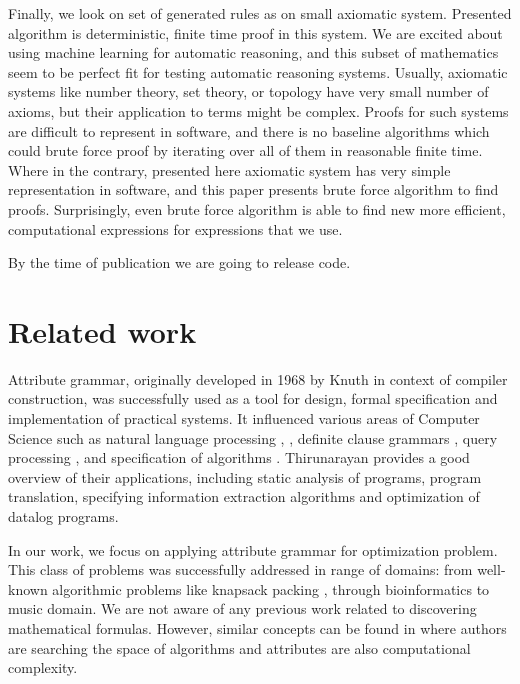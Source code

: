 \documentclass{article}
\begin{document}
Finally, we look on set of generated rules as on small axiomatic system.
Presented algorithm is deterministic, finite time proof in this system.
We are excited about using machine learning for automatic reasoning, and
this subset of mathematics seem to be perfect fit for testing automatic reasoning systems.
Usually, axiomatic systems like number theory, set theory, or topology have very small
number of axioms, but their application to terms might be complex. Proofs
for such systems are difficult to represent in software, and there is no
baseline algorithms which could brute force proof by iterating over all of them in reasonable finite time.
Where in the contrary, presented here axiomatic system has very simple representation
in software, and this paper presents brute force algorithm to find proofs. 
Surprisingly, even brute force algorithm is able to find new more efficient,
computational expressions for expressions that we use.

By the time of publication we are going to release code.


\section{Related work} \label{relatedwork}


Attribute grammar, originally developed in 1968 by Knuth \cite{knuth1968semantics} in context of compiler
construction, was successfully used as a tool for design, formal specification
and implementation of practical systems. It influenced various areas of
Computer Science such as natural language processing \cite{hafiz2011modular}, \cite{starkie2002inferring}, 
definite clause grammars \cite{bratko2001prolog}, query processing \cite{koch2007attribute}, \cite{ramakrishnan1991top} and specification of algorithms \cite{bellanova1984examples}.
Thirunarayan \cite{thirunarayan2009attribute} provides a good overview of their
applications, including static analysis of programs, program translation, specifying information
extraction algorithms and optimization of datalog programs.

In our work, we focus on applying attribute grammar for optimization problem. This class
of problems was successfully addressed in range of domains: from well-known algorithmic problems 
like knapsack packing \cite{o2004solving}, through bioinformatics \cite{waldispuhl2002approximate} to music domain\cite{desainte1994using}.
We are not aware of any previous work related to discovering mathematical formulas. However,
similar concepts can be found in \cite{cheung1999attribute} where authors are searching
the space of algorithms and attributes are also computational complexity.
\end{document}
